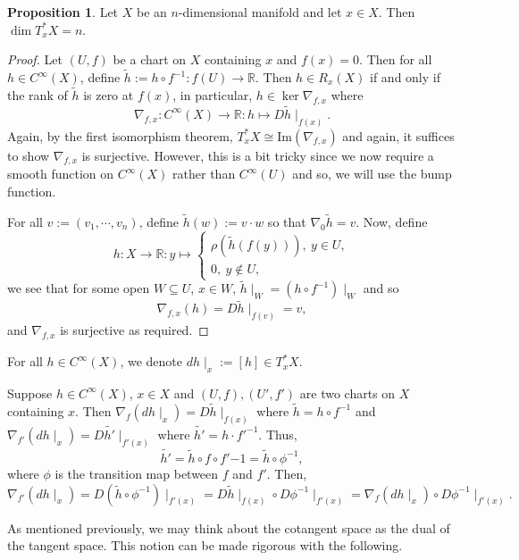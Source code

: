 \documentclass[]{article}
\theoremstyle{definition}
\theoremstyle{definition}
\newtheorem{proposition}{Proposition}[section]
\begin{document}
\begin{proposition}
  Let \(X\) be an \(n\)-dimensional manifold and let \(x \in X\). Then 
  \(\dim T^*_x X = n\).
\end{proposition}
\begin{proof}
  Let \((U, f)\) be a chart on \(X\) containing \(x\) and \(f(x) = 0\). 
  Then for all \(h \in C^\infty(X)\), define 
  \(\tilde h := h \circ f^{-1} : f(U) \to \mathbb{R}\).
  Then \(h \in R_x(X)\) if and only if the rank of \(\tilde h\) is zero at 
  \(f(x)\), in particular, \(h \in \ker \nabla_{f, x}\) where 
  \[\nabla_{f, x} : C^\infty(X) \to \mathbb{R} : h \mapsto D\tilde h\mid_{f(x)}.\]
  Again, by the first isomorphism theorem, 
  \(T^*_x X \cong \text{Im}(\nabla_{f, x})\) and again, it suffices to show 
  \(\nabla_{f, x}\) is surjective. However, this is a bit tricky since 
  we now require a smooth function on \(C^\infty(X)\) rather than 
  \(C^\infty(U)\) and so, we will use the bump function.

  For all \(v := (v_1, \cdots, v_n)\), define \(\tilde h(w) := v \cdot w\) so 
  that \(\nabla_0 \tilde h = v\). Now, define 
  \[h : X \to \mathbb{R} : y \mapsto \begin{cases}
    \rho(\tilde h(f(y))), \ y \in U,\\
    0, \ y \not\in U,
  \end{cases}\]
  we see that for some open \(W \subseteq U\), \(x \in W\), 
  \(\tilde h\mid_W = (h \circ f^{-1})\mid_W\) and so 
  \[\nabla_{f, x}(h) = D\tilde h\mid_{f(v)} = v,\]
  and \(\nabla_{f, x}\) is surjective as required.
\end{proof}

For all \(h \in C^\infty(X)\), we denote \(dh\mid_x := [h] \in T^*_x X\).

Suppose \(h \in C^\infty(X)\), \(x \in X\) and \((U, f), (U', f')\) are 
two charts on \(X\) containing \(x\). Then 
\(\nabla_f(dh\mid_x) = D\tilde h\mid_{f(x)}\) where 
\(\tilde h = h \circ f^{-1}\) and \(\nabla_{f'}(dh\mid_x) = 
D\tilde {h'}\mid_{f'(x)}\) where \(\tilde {h'} = h \cdot f'^{-1}\). Thus, 
\[\tilde {h'} = \tilde h \circ f \circ f'{-1} = \tilde h \circ \phi^{-1},\]
where \(\phi\) is the transition map between \(f\) and \(f'\). Then, 
\[\nabla_{f'}(dh\mid_x) = D(\tilde h \circ \phi^{-1})\mid_{f'(x)} = 
  D\tilde h\mid_{f(x)} \circ D \phi^{-1}\mid_{f'(x)} 
  = \nabla_f(dh\mid_x) \circ D\phi^{-1}\mid_{f'(x)}.\]

As mentioned previously, we may think about the cotangent space as the dual 
of the tangent space. This notion can be made rigorous with the following.
\end{document}
